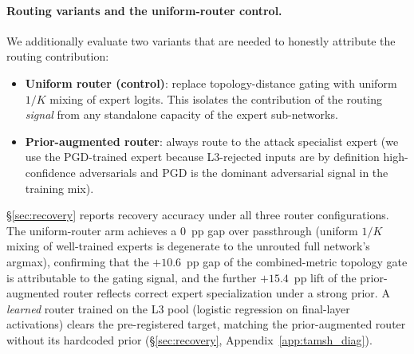 \paragraph{Routing variants and the uniform-router control.}
We additionally evaluate two variants that are needed to honestly attribute
the routing contribution:
\begin{itemize}[leftmargin=*,noitemsep]
  \item \textbf{Uniform router (control)}: replace topology-distance gating
    with uniform $1/K$ mixing of expert logits. This isolates the
    contribution of the routing \emph{signal} from any standalone capacity
    of the expert sub-networks.
  \item \textbf{Prior-augmented router}: always route to the attack
    specialist expert (we use the PGD-trained expert because L3-rejected
    inputs are by definition high-confidence adversarials and PGD is the
    dominant adversarial signal in the training mix).
\end{itemize}
\S\ref{sec:recovery} reports recovery accuracy under all three router
configurations. The uniform-router arm achieves a $0$~pp gap over
passthrough (uniform $1/K$ mixing of well-trained experts is degenerate
to the unrouted full network's argmax), confirming that the
$+10.6$~pp gap of the combined-metric topology gate is attributable to the
gating signal, and the further $+15.4$~pp lift of the prior-augmented
router reflects correct expert specialization under a strong prior. A
\emph{learned} router trained on the L3 pool (logistic regression on
final-layer activations) clears the pre-registered target, matching the
prior-augmented router without its hardcoded prior
(\S\ref{sec:recovery}, Appendix~\ref{app:tamsh_diag}).
